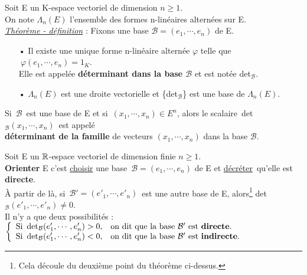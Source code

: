 \vspace{1.5cm}

Soit E un K-espace vectoriel de dimension \(n\geq 1\).\\
On note \(\Lambda_n(E)\) l'ensemble des formes n-linéaires alternées sur E.\\
\underline{\emph{Théorème - définition}} : Fixons une base \(\mathcal{B}=(e_1,\cdots,e_n)\) de E.\vspace{-0.1cm}
\begin{itemize}[leftmargin=2cm]
    \item[•] Il existe une unique forme n-linéaire alternée \(\varphi\) telle que \(\ \varphi(e_1,\cdots,e_n)=1_K\).\\
    Elle est appelée \textbf{déterminant dans la base \(\mathcal{B}\)} et est notée det\(_\mathcal{B}\).\vspace{0.1cm}

    \item[•] \(\Lambda_n(E)\) est une droite vectorielle et \{det\(_\mathcal{B}\)\} est une base de \(\Lambda_n(E).\)
\end{itemize}

\vspace{1.2cm}

\noindent Si \(\,\mathcal{B}\,\) est une base de E et si \(\,(x_1,\cdots,x_n)\in E^n\), alors le scalaire\, det\(_\mathcal{B}(x_1,\cdots,x_n)\,\) est appelé\\
\textbf{déterminant de la famille} de vecteurs \((x_1,\cdots,x_n)\) dans la base \(\mathcal{B}\).

\newpage

Soit E un \(\mathbb{R}\)-espace vectoriel de dimension finie \(n\geq 1\).\\
\textbf{Orienter} E c'est \underline{choisir} une base \(\,\mathcal{B}=(e_1,\cdots,e_n)\) de E et \guillemotleft\underline{décréter}\guillemotright \ qu'elle est \textbf{directe}. \\
À partir de là, si \(\,\mathcal{B}'=(e'_1,\cdots,e'_n)\,\) est une autre base de E, alors\footnote{Cela découle du deuxième point du théorème ci-dessus.} det\(_\mathcal{B}(e'_1,\cdots,e'_n)\neq 0\).\vspace{0.25cm}\\
Il n'y a que deux possibilités : \(\left\{\begin{array}{ll}
    \text{Si } \det_\mathcal{B}(e'_1,\cdots,e'_n)>0, & \text{on dit que la base }\mathcal{B}' \text{ est \textbf{directe}\index{base directe}}.  \\
     \text{Si } \det_\mathcal{B}(e'_1,\cdots,e'_n)<0, & \text{on dit que la base }\mathcal{B}' \text{ est \textbf{indirecte}\index{base indirecte}}.
\end{array} \right.\)

